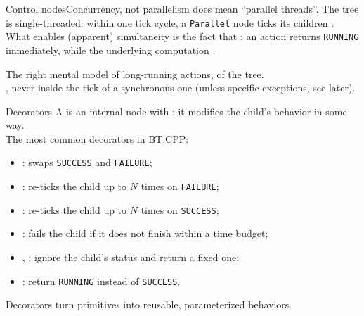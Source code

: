 \begin{frame}{Control nodes}{Concurrency, not parallelism}
  \justifying
   does  mean ``parallel threads''. The tree is single-threaded: within one tick cycle, a \texttt{Parallel} node ticks its children .\\
  \bigskip
  What enables (apparent) simultaneity is the fact that : an action returns \texttt{RUNNING} immediately, while the underlying computation .\\
  \bigskip
  \begin{alertblock}{The right mental model}
    \justifying
     of long-running actions,  of the tree.\\
    , never inside the tick of a synchronous one (unless specific exceptions, see later).
  \end{alertblock}
\end{frame}
\begin{frame}{Decorators}
  \justifying
  A  is an internal node with : it modifies the child's behavior in some way.\\
  \bigskip
  The most common decorators in BT.CPP:
  \begin{itemize}
    \item {}: swaps \texttt{SUCCESS} and \texttt{FAILURE};
    \item {}: re-ticks the child up to $N$ times on \texttt{FAILURE};
    \item {}: re-ticks the child up to $N$ times on \texttt{SUCCESS};
    \item {}: fails the child if it does not finish within a time budget;
    \item {}, : ignore the child's status and return a fixed one;
    \item {}: return \texttt{RUNNING} instead of \texttt{SUCCESS}.
  \end{itemize}
  \bigskip
  Decorators turn primitives into reusable, parameterized behaviors.
\end{frame}

